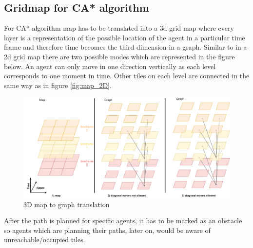 \subsection{Gridmap for CA* algorithm}
For CA* algorithm map has to be translated into a 3d grid map where every layer is a representation of the possible location of the agent in a particular time frame and therefore time becomes the third dimension in a graph. Similar to in a 2d grid map there are two possible modes which are represented in the figure below. An agent can only move in one direction vertically as each level corresponds to one moment in time. Other tiles on each level are connected in the same way as in figure \ref{fig:map_2D}.
\begin{figure}[H]
    \centering
    \includegraphics[width=\textwidth]{pictures/map_3D.png}
    \caption{ 3D map to graph translation }
    \label{fig:map_3D}
\end{figure}
After the path is planned for specific agents, it has to be marked as an obstacle so agents which are planning their paths, later on, would be aware of unreachable/occupied tiles.

